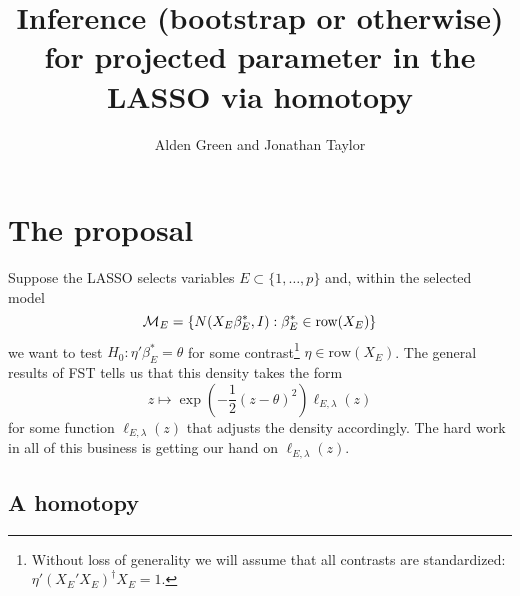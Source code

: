 \documentclass{article}
\title{ {\bf Inference (bootstrap or otherwise)
    for projected parameter in the LASSO via homotopy}}
\author{Alden Green and Jonathan Taylor}
\begin{document}
	\maketitle \RaggedRight

        
        \section{The proposal}

        Suppose the LASSO selects variables $E \subset \{1, \dots, p\}$ and, within the
        selected model
        $${\cal M}_E = \left\{N(X_E\beta_E^*, I): \beta_E^* \in \text{row}(X_E)\right\}$$
        we want to
        test $H_0:\eta'\beta_E^*=\theta$ for some contrast\footnote{Without loss of generality we will assume that all contrasts are standardized: $\eta'(X_E'X_E)^{\dagger}X_E=1$.} $\eta \in \text{row}(X_E)$. The general
        results of FST tells us that this density takes the form
        $$
        z \mapsto \exp\left(-\frac{1}{2}(z-\theta)^2\right) \ell_{E,\lambda}(z)
        $$
        for some function $\ell_{E,\lambda}(z)$ that adjusts the density accordingly. The hard
        work in all of this business is getting our hand on $\ell_{E,\lambda}(z)$.

        \subsection{A homotopy}
\end{document}
